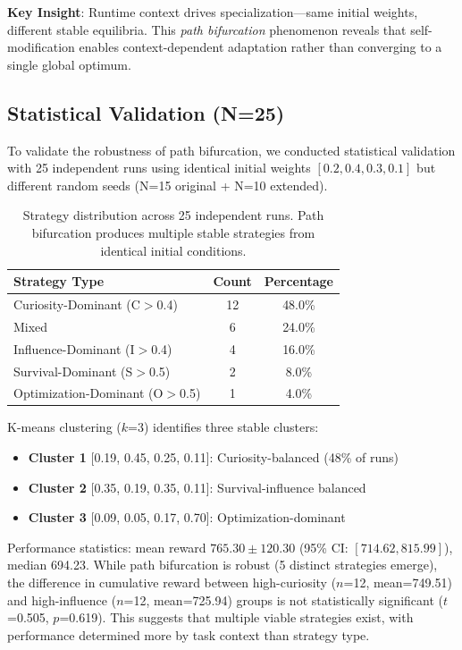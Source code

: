 \documentclass{article}
\begin{document}
\textbf{Key Insight}: Runtime context drives specialization---same initial weights, different stable equilibria. This \textit{path bifurcation} phenomenon reveals that self-modification enables context-dependent adaptation rather than converging to a single global optimum.

\subsection{Statistical Validation (N=25)}
To validate the robustness of path bifurcation, we conducted statistical validation with 25 independent runs using identical initial weights $[0.2, 0.4, 0.3, 0.1]$ but different random seeds (N=15 original + N=10 extended).

\begin{table}[h]
\centering
\begin{tabular}{lcc}
\toprule
Strategy Type & Count & Percentage \\
\midrule
Curiosity-Dominant (C$>$0.4) & 12 & 48.0\% \\
Mixed & 6 & 24.0\% \\
Influence-Dominant (I$>$0.4) & 4 & 16.0\% \\
Survival-Dominant (S$>$0.5) & 2 & 8.0\% \\
Optimization-Dominant (O$>$0.5) & 1 & 4.0\% \\
\bottomrule
\end{tabular}
\caption{Strategy distribution across 25 independent runs. Path bifurcation produces multiple stable strategies from identical initial conditions.}
\label{tab:strategy_distribution}
\end{table}

K-means clustering ($k$=3) identifies three stable clusters:
\begin{itemize}
\item \textbf{Cluster 1} [0.19, 0.45, 0.25, 0.11]: Curiosity-balanced (48\% of runs)
\item \textbf{Cluster 2} [0.35, 0.19, 0.35, 0.11]: Survival-influence balanced
\item \textbf{Cluster 3} [0.09, 0.05, 0.17, 0.70]: Optimization-dominant
\end{itemize}

Performance statistics: mean reward $765.30 \pm 120.30$ (95\% CI: $[714.62, 815.99]$), median 694.23. While path bifurcation is robust (5 distinct strategies emerge), the difference in cumulative reward between high-curiosity ($n$=12, mean=749.51) and high-influence ($n$=12, mean=725.94) groups is not statistically significant ($t$=0.505, $p$=0.619). This suggests that multiple viable strategies exist, with performance determined more by task context than strategy type.
\end{document}
